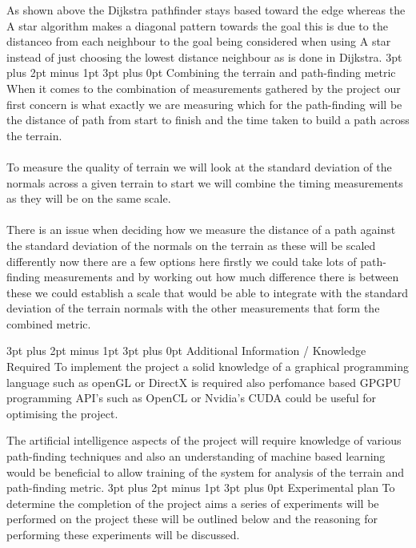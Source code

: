 \documentclass[12pt,a4paper]{article}
\makeatletter
\renewcommand\subsection{\@startsection {subsection}{1}{2mm} %
                               {3pt plus 2pt minus 1pt} %
                               {3pt plus 0pt} %
                               {\normalfont\bfseries}}
\makeatother
\begin{document}
As shown above the Dijkstra pathfinder stays based toward the edge whereas the A star algorithm makes a diagonal pattern towards the goal this is due to the distanceo from each neighbour to the goal being considered when using A star instead of just choosing the lowest distance neighbour as is done in Dijkstra.  
\pagebreak
\subsection{Combining the terrain and path-finding metric}
When it comes to the combination of measurements gathered by the project our first concern is what exactly we are measuring which for the path-finding will be the distance of path from start to finish and the time taken to build a path across the terrain.\\\\To measure the quality of terrain we will look at the standard deviation of the normals across a given terrain to start we will combine the timing measurements as they will be on the same scale.\\\\ There is an issue when deciding how we measure the distance of a path against the standard deviation of the normals on the terrain as these will be scaled differently now there are a few options here firstly we could take lots of path-finding measurements and by working out how much difference there is between these we could establish a scale that would be able to integrate with the standard deviation of the terrain normals with the other measurements that form the combined metric.      


\subsection{Additional Information / Knowledge Required}
To implement the project a solid knowledge of a graphical programming language such as openGL or DirectX is required also perfomance based GPGPU programming API's  such as OpenCL or Nvidia's CUDA could be useful for optimising the project.

The artificial intelligence aspects of the project will require knowledge of various path-finding techniques and also an understanding of machine based learning would be beneficial to allow training of the system for analysis of the terrain and path-finding metric.   
\subsection{Experimental plan}
To determine the completion of the project aims a series of experiments will be performed on the project these will be outlined below and the reasoning for performing these experiments will be discussed.
\end{document}

